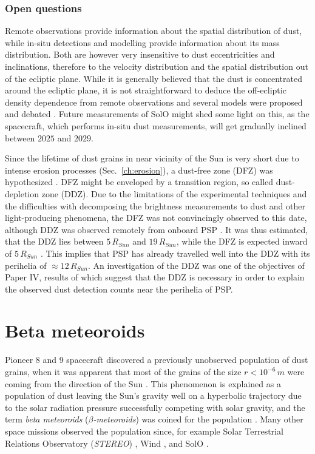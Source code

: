 \subsubsection{Open questions}

Remote observations provide information about the spatial distribution of dust, while in-situ detections and modelling provide information about its mass distribution. Both are however very insensitive to dust eccentricities and inclinations, therefore to the velocity distribution and the spatial distribution out of the ecliptic plane. While it is generally believed that the dust is concentrated around the ecliptic plane, it is not straightforward to deduce the off-ecliptic density dependence from remote observations and several models were proposed and debated \citep{giese1986three}. Future measurements of SolO might shed some light on this, as the spacecraft, which performs in-situ dust measurements, will get gradually inclined between $2025$ and $2029$.

Since the lifetime of dust grains in near vicinity of the Sun is very short due to intense erosion processes (Sec.~\ref{ch:erosion}), a dust-free zone (DFZ) was hypothesized \citep{russell1929meteoric}. DFZ might be enveloped by a transition region, so called dust-depletion zone (DDZ). Due to the limitations of the experimental techniques and the difficulties with decomposing the brightness measurements to dust and other light-producing phenomena, the DFZ was not convincingly observed to this date, although DDZ was observed remotely from onboard PSP \citep{stenborg2018characterization}. It was thus estimated, that the DDZ lies between $5 \, R_{Sun}$ and $19 \, R_{Sun}$, while the DFZ is expected inward of $5 \, R_{Sun}$ \citep{stenborg2022psp}. This implies that PSP has already travelled well into the DDZ with its perihelia of $\approx 12 \, R_{Sun}$. An investigation of the DDZ was one of the objectives of Paper IV, results of which suggest that the DDZ is necessary in order to explain the observed dust detection counts near the perihelia of PSP.

\section{Beta meteoroids}

Pioneer 8 and 9 spacecraft discovered a previously unobserved population of dust grains, when it was apparent that most of the grains of the size $r < 10^{-6} \, \si{m}$ were coming from the direction of the Sun \citep{berg1973evidence}. This phenomenon is explained as a population of dust leaving the Sun's gravity well on a hyperbolic trajectory due to the solar radiation pressure successfully competing with solar gravity, and the term \textit{beta meteoroids} ($\beta$\textit{-meteoroids}) was coined for the population \citep{zook1975source}. Many other space missions observed the population since, for example Solar Terrestrial Relations Observatory (\textit{STEREO}) \citep{zaslavsky2012interplanetary}, Wind \citep{malaspina2014interplanetary}, and SolO \cite{zaslavsky2021first}.

